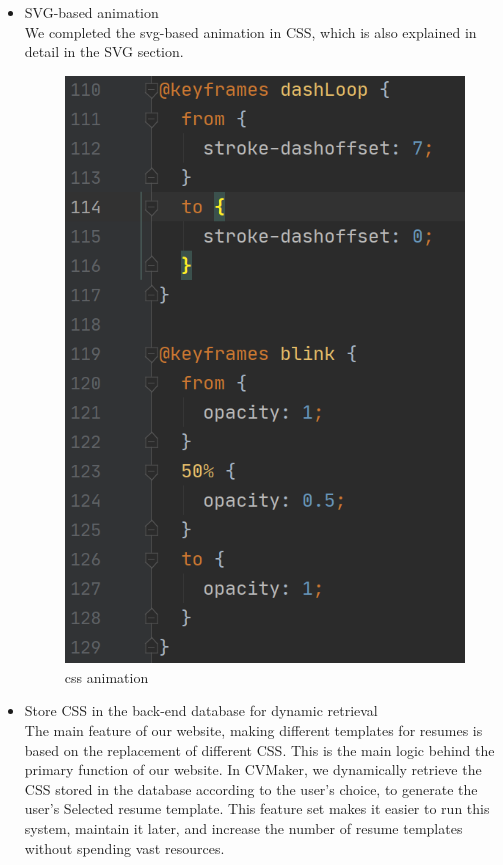 \documentclass[11pt]{article}
\begin{document}
\begin{spacing}{1.0}
\begin{itemize}
\item SVG-based animation\\
 We completed the svg-based animation in CSS, which is also explained in detail in the SVG section.
 \begin{figure}[H]
 	\centering
 	\includegraphics[scale=.5]{figures/cssAnimation2.png}
 	\caption{css animation}
 	\label{fig:11}
 \end{figure}
\item Store CSS in the back-end database for dynamic retrieval\\
The main feature of our website, making different templates for resumes is based on the replacement of different CSS. This is the main logic behind the primary function of our website. In CVMaker, we dynamically retrieve the CSS stored in the database according to the user's choice, to generate the user's Selected resume template. This feature set makes it easier to run this system, maintain it later, and increase the number of resume templates without spending vast resources.

\end{itemize}
\end{spacing}
\end{document}
